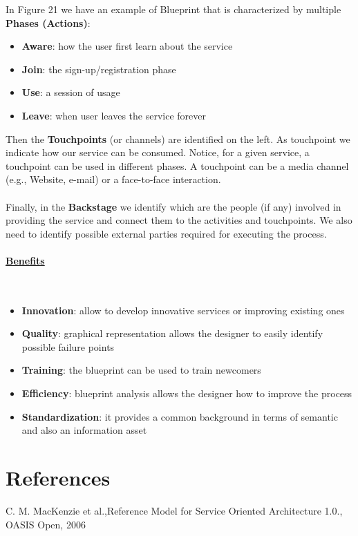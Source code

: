 \documentclass[10pt,a4paper]{article}
\newcommand{\myparagraph}[1]{\paragraph{\uline{#1}}\mbox{}\\[0.05in]}
\begin{document}
In Figure 21 we have an example of Blueprint that is characterized by multiple \textbf{Phases (Actions)}:
\begin{itemize}
	\item \textbf{Aware}: how the user first learn about the service
	\item \textbf{Join}: the sign-up/registration phase
	\item \textbf{Use}: a session of usage
	\item \textbf{Leave}: when user leaves the service forever
\end{itemize}
Then the \textbf{Touchpoints} (or channels) are identified on the left. As touchpoint we indicate how our service can be consumed. Notice, for a given service, a touchpoint can be used in different phases. A touchpoint can be a media channel (e.g., Website, e-mail) or a face-to-face interaction. \\ \\
Finally, in the \textbf{Backstage} we identify which are the people (if any) involved in providing the service and connect them to the activities and touchpoints. We also need to identify possible external parties required for executing the process.
\myparagraph{Benefits}
\begin{itemize}
	\item \textbf{Innovation}: allow to develop innovative services or improving existing ones
	\item \textbf{Quality}: graphical representation allows the designer to easily identify possible failure points
	\item \textbf{Training}: the blueprint can be used to train newcomers
	\item \textbf{Efficiency}: blueprint analysis allows the designer how to improve the process
	\item \textbf{Standardization}: it provides a common background in terms of semantic and also an information asset
\end{itemize}
\clearpage
\section{\LARGE References}
\begin{enumerate}[label={[\arabic*]}]
  \item C. M. MacKenzie et al.,Reference Model for Service Oriented
Architecture 1.0., OASIS Open, 2006
\end{enumerate}
\end{document}
